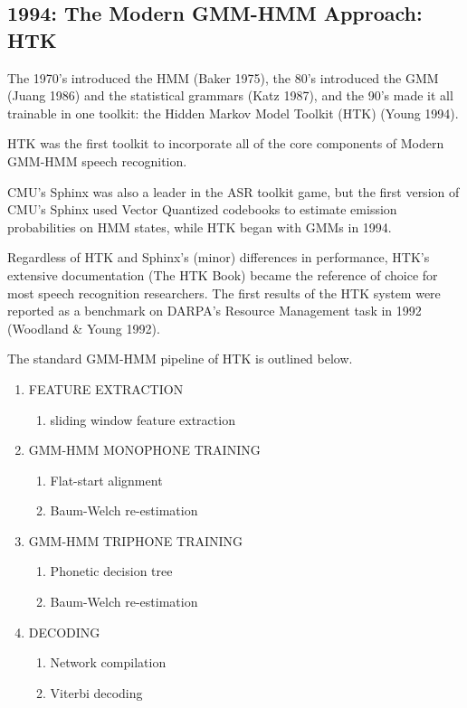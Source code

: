 \documentclass[10pt,a4paper]{article}
\begin{document}
\subsection{1994: The Modern GMM-HMM Approach: HTK}

The 1970's introduced the HMM (Baker 1975), the 80's introduced the GMM (Juang 1986) and the statistical grammars (Katz 1987), and the 90's made it all trainable in one toolkit: the Hidden Markov Model Toolkit (HTK) (Young 1994).

HTK was the first toolkit to incorporate all of the core components of Modern GMM-HMM speech recognition.

CMU's Sphinx was also a leader in the ASR toolkit game, but the first version of CMU's Sphinx used Vector Quantized codebooks to estimate emission probabilities on HMM states, while HTK began with GMMs in 1994.

Regardless of HTK and Sphinx's (minor) differences in performance, HTK's extensive documentation (The HTK Book) became the reference of choice for most speech recognition researchers. The first results of the HTK system were reported as a benchmark on DARPA's Resource Management task in 1992 (Woodland \& Young 1992).

The standard GMM-HMM pipeline of HTK is outlined below. 


\begin{enumerate}

\item FEATURE EXTRACTION
  \begin{enumerate}
  \item sliding window feature extraction
  \end{enumerate}

\item GMM-HMM MONOPHONE TRAINING
  \begin{enumerate}
  \item Flat-start alignment
  \item Baum-Welch re-estimation
  \end{enumerate}
  
\item GMM-HMM TRIPHONE TRAINING
  \begin{enumerate}
  \item Phonetic decision tree
  \item Baum-Welch re-estimation
  \end{enumerate}
  
\item DECODING
  \begin{enumerate}
  \item Network compilation
  \item Viterbi decoding
  \end{enumerate}
  
\end{enumerate}
\end{document}
